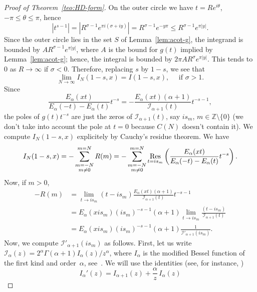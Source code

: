 \documentclass[a4paper]{amsart}
\newcommand{\Z}{\mathbb{Z}}
\newcommand{\I}{\mathcal{I}}
\newcommand{\Ea}{E_{\alpha}}
\newcommand{\Res}{\operatornamewithlimits{Res}}
\theoremstyle{plain}
\theoremstyle{definition}
\theoremstyle{remark}
\numberwithin{equation}{section}
\begin{document}
\begin{proof}[Proof of Theorem~\ref{teo:HD-form}]
On the outer circle we have $t=Re^{i\theta}$, $-\pi \leq \theta \leq \pi$, hence
\[
  |t^{s-1}| = |R^{\sigma-1} e^{\pi i(\sigma +iy)}| 
  = R^{\sigma-1}e^{-y \pi}  \leq R^{\sigma-1}e^{\pi |y|}. 
\]
Since the outer circle lies in the set $S$ of Lemma~\ref{lem:acot-g}, the integrand is bounded by $AR^{\sigma-1}e^{\pi |y|}$, where $A$ is the bound for $g(t)$ implied by Lemma~\ref{lem:acot-g}; hence, the integral is bounded by $2\pi AR^{\sigma}e^{\pi |y|}$. This tends to $0$ as $R \to \infty$ if $\sigma < 0$. Therefore, replacing $s$ by $1-s$, we see that
\[
  \lim_{N\to \infty}I_N(1-s,x) = I(1-s,x),\quad \text{ if } \sigma > 1.
\]
Since
\[
  \frac{\Ea(xt)}{\Ea(-t)-\Ea(t)} t^{-s} 
  = -\frac{\Ea(xt)(\alpha+1)}{\I_{\alpha+1}(t)} t^{-s-1},
\]
the poles of $g(t)t^{-s}$ are just the zeros of $\I_{\alpha+1}(t)$, say $i s_m$, $m\in \Z\setminus \{0\}$ (we don't take into account the pole at $t = 0$ because $C(N)$ doesn't contain it). We compute $I_N(1-s,x)$ explicitely by Cauchy's residue theorem. We have
\begin{equation}
\label{eq:exp-res}
I_N(1-s,x) = -\sum_{\substack{m=-N\\m \ne 0}}^{m=N} R(m) 
= -\sum_{\substack{m=-N\\m \ne 0}}^{m=N} 
\Res_{t=i s_m}\left(\frac{\Ea(xt)}{\Ea(-t)-\Ea(t)} t^{-s}\right).
\end{equation}
Now, if $m>0$,
\begin{align*}
  -R(m) & = \lim_{t\to i s_m} (t-is_m)\frac{\Ea(xt)(\alpha+1)}{\I_{\alpha+1}(t)} t^{-s-1} \\
  & = \Ea(xis_m)(is_m)^{-s-1}(\alpha+1)\lim_{t\to i s_m}\frac{(t-is_m)}{\I_{\alpha+1}(t)} \\
  & = \Ea(xis_m)(is_m)^{-s-1}(\alpha+1)\frac{1}{\I'_{\alpha+1}(i s_m)}.
\end{align*}
Now, we compute $\I'_{\alpha+1}(i s_m)$ as follows. First, let us write $\I_\alpha(z) = 2^\alpha \Gamma(\alpha+1){I_{\alpha}(z)}/{z^{\alpha}}$, where $I_\alpha$ is the modified Bessel function of the first kind and order~$\alpha$, see~\cite{Wat, OlMa-NIST}. We will use the identities (see, for instance, \cite[10.29.2]{OlMa-NIST})
\begin{equation}
\label{eq:Ider+}
  I_\alpha'(z) = I_{\alpha+1}(z) + \frac{\alpha}{z}\,I_\alpha (z)
\end{equation}

\end{proof}
\end{document}
